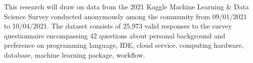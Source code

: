This research will draw on data from the 2021 Kaggle Machine Learning \& Data Science Survey conducted anonymously among the community from 09/01/2021 to 10/04/2021. The dataset consists of 25,973 valid responses to the survey questionnaire encompassing 42 questions about personal background and preference on programming language, IDE, cloud service, computing hardware, database, machine learning package, workflow.